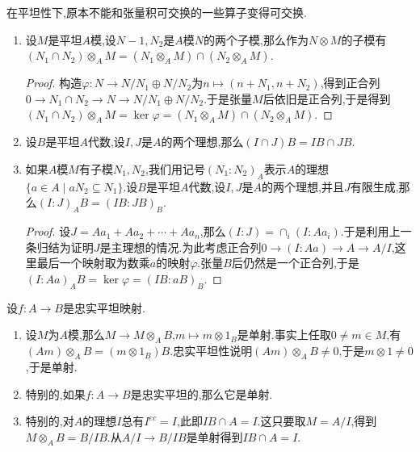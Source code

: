 在平坦性下,原本不能和张量积可交换的一些算子变得可交换.
\begin{enumerate}
	\item 设$M$是平坦$A$模,设$N-1,N_2$是$A$模$N$的两个子模,那么作为$N\otimes M$的子模有$(N_1\cap N_2)\otimes_AM=(N_1\otimes_AM)\cap(N_2\otimes_AM)$.
	\begin{proof}
		
		构造$\varphi:N\to N/N_1\oplus N/N_2$为$n\mapsto(n+N_1,n+N_2)$,得到正合列$0\to N_1\cap N_2\to N\to N/N_1\oplus N/N_2$.于是张量$M$后依旧是正合列,于是得到$(N_1\cap N_2)\otimes_AM=\ker\varphi=(N_1\otimes_AM)\cap(N_2\otimes_AM)$.
	\end{proof}
	\item 设$B$是平坦$A$代数,设$I,J$是$A$的两个理想,那么$(I\cap J)B=IB\cap JB$.
	\item 如果$A$模$M$有子模$N_1,N_2$,我们用记号$(N_1:N_2)_A$表示$A$的理想$\{a\in A\mid aN_2\subseteq N_1\}$.设$B$是平坦$A$代数,设$I,J$是$A$的两个理想,并且$J$有限生成,那么$(I:J)_AB=(IB:JB)_B$.
	\begin{proof}
		
		设$J=Aa_1+Aa_2+\cdots+Aa_n$,那么$(I:J)=\cap_i(I:Aa_i)$.于是利用上一条归结为证明$J$是主理想的情况.为此考虑正合列$0\to(I:Aa)\to A\to A/I$,这里最后一个映射取为数乘$a$的映射$\varphi$.张量$B$后仍然是一个正合列,于是$(I:Aa)_AB=\ker\varphi=(IB:aB)_B$.
	\end{proof}
\end{enumerate}

设$f:A\to B$是忠实平坦映射.
\begin{enumerate}
	\item 设$M$为$A$模,那么$M\to M\otimes_AB$,$m\mapsto m\otimes1_B$是单射.事实上任取$0\not=m\in M$,有$(Am)\otimes_AB=(m\otimes1_B)B$.忠实平坦性说明$(Am)\otimes_AB\not=0$,于是$m\otimes1\not=0$,于是单射.
	\item 特别的,如果$f:A\to B$是忠实平坦的,那么它是单射.
	\item 特别的,对$A$的理想$I$总有$I^{ec}=I$,此即$IB\cap A=I$.这只要取$M=A/I$,得到$M\otimes_AB=B/IB$.从$A/I\to B/IB$是单射得到$IB\cap A=I$.
\end{enumerate}

